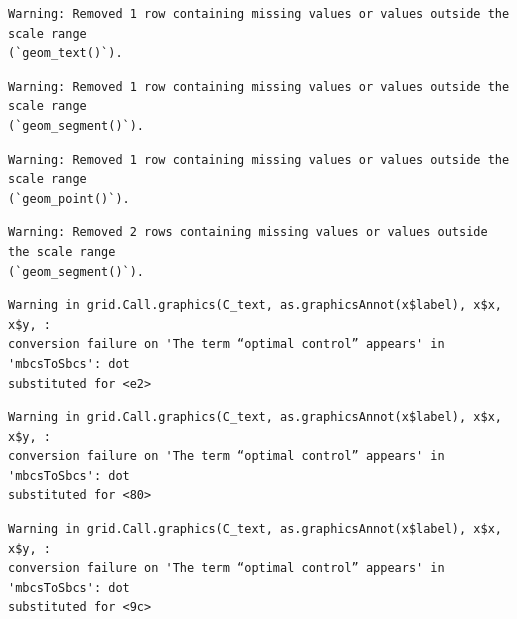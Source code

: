 \documentclass[
  letterpaper,
  DIV=11,
  numbers=noendperiod]{scrreprt}
\newenvironment{Shaded}{\begin{snugshade}}{\end{snugshade}}
\newcommand{\AttributeTok}[1]{\textcolor[rgb]{0.40,0.45,0.13}{#1}}
\newcommand{\DecValTok}[1]{\textcolor[rgb]{0.68,0.00,0.00}{#1}}
\newcommand{\DocumentationTok}[1]{\textcolor[rgb]{0.37,0.37,0.37}{\textit{#1}}}
\newcommand{\FunctionTok}[1]{\textcolor[rgb]{0.28,0.35,0.67}{#1}}
\newcommand{\NormalTok}[1]{\textcolor[rgb]{0.00,0.23,0.31}{#1}}
\newcommand{\OtherTok}[1]{\textcolor[rgb]{0.00,0.23,0.31}{#1}}
\newcommand{\SpecialCharTok}[1]{\textcolor[rgb]{0.37,0.37,0.37}{#1}}
\newcommand{\StringTok}[1]{\textcolor[rgb]{0.13,0.47,0.30}{#1}}
\theoremstyle{definition}
\theoremstyle{remark}
\begin{document}
\begin{Shaded}
\end{Shaded}

\begin{verbatim}
Warning: Removed 1 row containing missing values or values outside the scale range
(`geom_text()`).
\end{verbatim}

\begin{verbatim}
Warning: Removed 1 row containing missing values or values outside the scale range
(`geom_segment()`).
\end{verbatim}

\begin{verbatim}
Warning: Removed 1 row containing missing values or values outside the scale range
(`geom_point()`).
\end{verbatim}

\begin{verbatim}
Warning: Removed 2 rows containing missing values or values outside the scale range
(`geom_segment()`).
\end{verbatim}

\begin{verbatim}
Warning in grid.Call.graphics(C_text, as.graphicsAnnot(x$label), x$x, x$y, :
conversion failure on 'The term “optimal control” appears' in 'mbcsToSbcs': dot
substituted for <e2>
\end{verbatim}

\begin{verbatim}
Warning in grid.Call.graphics(C_text, as.graphicsAnnot(x$label), x$x, x$y, :
conversion failure on 'The term “optimal control” appears' in 'mbcsToSbcs': dot
substituted for <80>
\end{verbatim}

\begin{verbatim}
Warning in grid.Call.graphics(C_text, as.graphicsAnnot(x$label), x$x, x$y, :
conversion failure on 'The term “optimal control” appears' in 'mbcsToSbcs': dot
substituted for <9c>
\end{verbatim}
\end{document}
